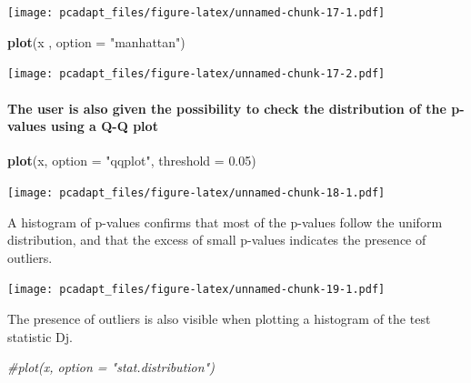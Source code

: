 \documentclass[]{article}
\newenvironment{Shaded}{\begin{snugshade}}{\end{snugshade}}
\newcommand{\KeywordTok}[1]{\textcolor[rgb]{0.13,0.29,0.53}{\textbf{#1}}}
\newcommand{\DataTypeTok}[1]{\textcolor[rgb]{0.13,0.29,0.53}{#1}}
\newcommand{\DecValTok}[1]{\textcolor[rgb]{0.00,0.00,0.81}{#1}}
\newcommand{\FloatTok}[1]{\textcolor[rgb]{0.00,0.00,0.81}{#1}}
\newcommand{\StringTok}[1]{\textcolor[rgb]{0.31,0.60,0.02}{#1}}
\newcommand{\CommentTok}[1]{\textcolor[rgb]{0.56,0.35,0.01}{\textit{#1}}}
\newcommand{\OtherTok}[1]{\textcolor[rgb]{0.56,0.35,0.01}{#1}}
\newcommand{\OperatorTok}[1]{\textcolor[rgb]{0.81,0.36,0.00}{\textbf{#1}}}
\newcommand{\NormalTok}[1]{#1}
\let\oldparagraph\paragraph
\renewcommand{\paragraph}[1]{\oldparagraph{#1}\mbox{}}
\begin{document}
\texttt{[image: pcadapt\_files/figure-latex/unnamed-chunk-17-1.pdf]}

\begin{Shaded}
\begin{Highlighting}[]
\KeywordTok{plot}\NormalTok{(x , }\DataTypeTok{option =} \StringTok{"manhattan"}\NormalTok{)}
\end{Highlighting}
\end{Shaded}

\texttt{[image: pcadapt\_files/figure-latex/unnamed-chunk-17-2.pdf]}

\paragraph{The user is also given the possibility to check the
distribution of the p-values using a Q-Q
plot}\label{the-user-is-also-given-the-possibility-to-check-the-distribution-of-the-p-values-using-a-q-q-plot}

\begin{Shaded}
\begin{Highlighting}[]
\KeywordTok{plot}\NormalTok{(x, }\DataTypeTok{option =} \StringTok{"qqplot"}\NormalTok{, }\DataTypeTok{threshold =} \FloatTok{0.05}\NormalTok{)}
\end{Highlighting}
\end{Shaded}

\texttt{[image: pcadapt\_files/figure-latex/unnamed-chunk-18-1.pdf]}

A histogram of p-values confirms that most of the p-values follow the
uniform distribution, and that the excess of small p-values indicates
the presence of outliers.

\begin{Shaded}
\end{Shaded}

\texttt{[image: pcadapt\_files/figure-latex/unnamed-chunk-19-1.pdf]}

The presence of outliers is also visible when plotting a histogram of
the test statistic Dj.

\begin{Shaded}
\begin{Highlighting}[]
\CommentTok{#plot(x, option = "stat.distribution")}
\end{Highlighting}
\end{Shaded}
\end{document}
